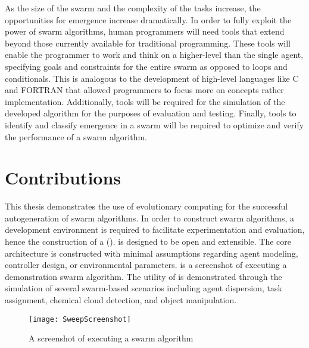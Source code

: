 As the size of the swarm and the complexity of the tasks increase, the opportunities for emergence increase dramatically.  In order to fully exploit the power of swarm algorithms, human programmers will need tools that extend beyond those currently available for traditional programming.  These tools will enable the programmer to work and think on a higher-level than the single agent, specifying goals and constraints for the entire swarm as opposed to loops and conditionals.  This is analogous to the development of high-level languages like C and FORTRAN that allowed programmers to focus more on concepts rather implementation.  Additionally, tools will be required for the simulation of the developed algorithm for the purposes of evaluation and testing.  Finally, tools to identify and classify emergence in a swarm will be required to optimize and verify the performance of a swarm algorithm. 

\section{Contributions}

This thesis demonstrates the use of evolutionary computing for the successful autogeneration of swarm algorithms.  In order to construct swarm algorithms, a development environment is required to facilitate experimentation and evaluation, hence the construction of a \SWEEPexp{} (\SWEEP{}).  \SWEEP{} is designed to be open and extensible.  The core \SWEEP{} architecture is constructed with minimal assumptions regarding  agent modeling, controller design, or environmental parameters.   is a screenshot of \SWEEP executing a demonstration swarm algorithm.  The utility of \SWEEP{} is demonstrated through the simulation of several swarm-based scenarios including agent dispersion, task assignment, chemical cloud detection, and object manipulation.

\begin{figure}[ht]
  \centering
  \texttt{[image: SweepScreenshot]}
\caption{A screenshot of \SWEEP executing a swarm algorithm}
\label{fig:SweepScreenShot}
\end{figure}

